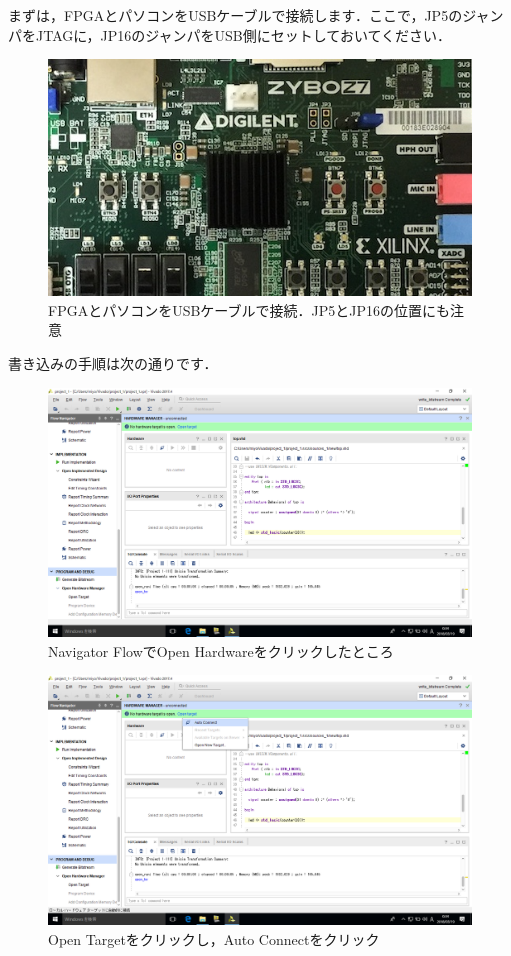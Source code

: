 \documentclass[a4paper,dvipdfmx]{jsarticle}
\begin{document}
まずは，FPGAとパソコンをUSBケーブルで接続します．ここで，JP5のジャンパをJTAGに，JP16のジャンパをUSB側にセットしておいてください．

 \begin{figure}[H]
  \begin{center}
   \includegraphics[width=.8\textwidth]{chapter03_figures/IMG_0002.JPG}
  \end{center}
  \caption{FPGAとパソコンをUSBケーブルで接続．JP5とJP16の位置にも注意}
 \end{figure}

書き込みの手順は次の通りです．

 \begin{figure}[H]
  \begin{center}
   \includegraphics[width=.8\textwidth]{chapter03_figures/VirtualBox_Windows10_19_03_2018_00_34_35.png}
  \end{center}
  \caption{Navigator FlowでOpen Hardwareをクリックしたところ}
 \end{figure}

 \begin{figure}[H]
  \begin{center}
   \includegraphics[width=.8\textwidth]{chapter03_figures/VirtualBox_Windows10_19_03_2018_00_34_45.png}
  \end{center}
  \caption{Open Targetをクリックし，Auto Connectをクリック}
 \end{figure}
\end{document}
